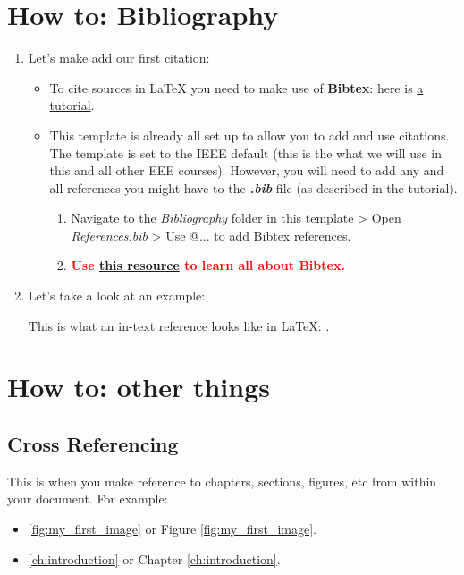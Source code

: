 \documentclass[class=report,11pt,crop=false]{standalone}
\begin{document}
\section{How to: Bibliography}
\begin{enumerate}
    \item Let's make add our first citation:
        \begin{itemize}
            \item To cite sources in LaTeX you need to make use of \textbf{Bibtex}: here is \href{https://www.overleaf.com/learn/latex/Bibliography_management_in_LaTeX}{a tutorial}. 
            \item This template is already all set up to allow you to add and use citations. The template is set to the IEEE default (this is the what we will use in this and all other EEE courses). However, you will need to add any and all references you might have to the \textbf{\textit{.bib}} file (as described in the tutorial). 
                \begin{enumerate}
                    \item Navigate to the \textit{Bibliography} folder in this template > Open \textit{References.bib} > Use @... to add Bibtex references.
                    \item \textcolor{red}{\textbf{Use \href{https://bibtex.eu}{this resource} to learn all about Bibtex.}}
                \end{enumerate}
            
        \end{itemize}
    \item Let's take a look at an example:        
            \begin{center}
                This is what an in-text reference looks like in LaTeX: \cite{rick_roll}.
            \end{center}      
\end{enumerate}


\section{How to: other things}
\subsection{Cross Referencing}
This is when you make reference to chapters, sections, figures, etc from within your document. For example: 
\begin{itemize}
    \item \autoref{fig:my_first_image} or Figure \ref{fig:my_first_image}.
    \item \autoref{ch:introduction} or Chapter \ref{ch:introduction}.
\end{itemize}
\end{document}
